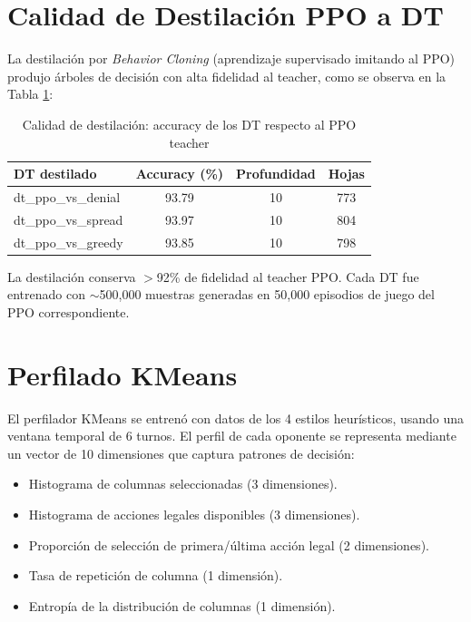 \section{Calidad de Destilación PPO a DT}

La destilación por \textit{Behavior Cloning} \cite{hussein2017imitation} (aprendizaje supervisado imitando al PPO) produjo árboles de decisión con alta fidelidad al teacher, como se observa en la Tabla \ref{tab:distillation}:

\begin{table}[H]
\centering
\caption{Calidad de destilación: accuracy de los DT respecto al PPO teacher}
\begin{tabular}{lccc}
\hline
\textbf{DT destilado} & \textbf{Accuracy (\%)} & \textbf{Profundidad} & \textbf{Hojas} \\
\hline
dt\_ppo\_vs\_denial  & 93.79 & 10 & 773  \\
dt\_ppo\_vs\_spread  & 93.97 & 10 & 804  \\
dt\_ppo\_vs\_greedy  & 93.85 & 10 & 798  \\
\hline
\end{tabular}
\label{tab:distillation}
\end{table}

La destilación conserva $>$92\% de fidelidad al teacher PPO. Cada DT fue entrenado con $\sim$500,000 muestras generadas en 50,000 episodios de juego del PPO correspondiente.

\section{Perfilado KMeans}

El perfilador KMeans \cite{lloyd1982kmeans} se entrenó con datos de los 4 estilos heurísticos, usando una ventana temporal de 6 turnos. El perfil de cada oponente se representa mediante un vector de 10 dimensiones que captura patrones de decisión:

\begin{itemize}
    \item Histograma de columnas seleccionadas (3 dimensiones).
    \item Histograma de acciones legales disponibles (3 dimensiones).
    \item Proporción de selección de primera/última acción legal (2 dimensiones).
    \item Tasa de repetición de columna (1 dimensión).
    \item Entropía de la distribución de columnas (1 dimensión).
\end{itemize}

